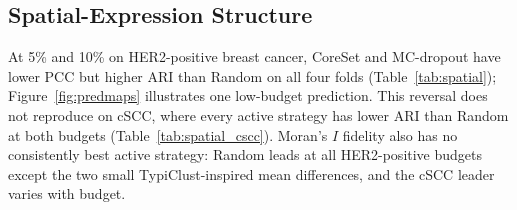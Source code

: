\documentclass[]{spie}
\begin{document}
\begin{table}[htbp]
\centering
\caption{cSCC PCC, mean $\pm$ SD over four folds. Bold marks the largest mean per budget.}
\label{tab:pcc_cscc}
\end{table}

\subsection{Spatial-Expression Structure}

At 5\% and 10\% on HER2-positive breast cancer, CoreSet and MC-dropout have lower PCC but higher ARI than Random on all four folds (Table~\ref{tab:spatial}); Figure~\ref{fig:predmaps} illustrates one low-budget prediction. This reversal does not reproduce on cSCC, where every active strategy has lower ARI than Random at both budgets (Table~\ref{tab:spatial_cscc}). Moran's $I$ fidelity also has no consistently best active strategy: Random leads at all HER2-positive budgets except the two small TypiClust-inspired mean differences, and the cSCC leader varies with budget.
\end{document}
